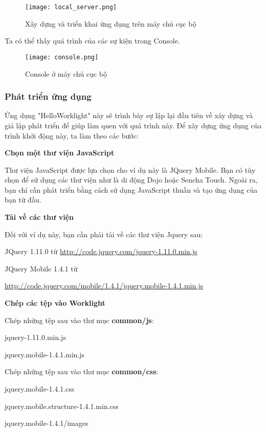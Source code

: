 \begin{figure}[!htb] 
\centering
\texttt{[image: local\_server.png]}
\caption{Xây dựng và triển khai ứng dụng trên máy chủ cục bộ}
\end{figure}
\newpage

Ta có thể thấy quá trình của các sự kiện trong Console.
\begin{figure}[!htb] 
\centering
\texttt{[image: console.png]}
\caption{Console ở máy chủ cục bộ}
\end{figure}

\subsubsection{Phát triển ứng dụng}
Ứng dụng "HelloWorklight" này sẽ trình bày sự lập lại đầu tiên về xây dựng và giả lập phát triển để giúp làm quen với quá trình này. Để xây dựng ứng dụng của trình khởi động này, ta làm theo các bước:

\quad \textbf{Chọn một thư viện JavaScript}

\quad Thư viện JavaScript được lựa chọn cho ví dụ này là JQuery Mobile. Bạn có tùy chọn để sử dụng các thư viện như là di động Dojo hoặc Sencha Touch. Ngoài ra, bạn chỉ cần phát triển bằng cách sử dụng JavaScript thuần và tạo ứng dụng của bạn từ đầu.

\quad \textbf{Tải về các thư viện}

\quad Đối với ví dụ này, bạn cần phải tải về các thư viện Jquery sau:

\quad \quad JQuery 1.11.0 từ \url{http://code.jquery.com/jquery-1.11.0.min.js}
 
\quad \quad JQuery Mobile 1.4.1 từ
 
\quad \quad \url{http://code.jquery.com/mobile/1.4.1/jquery.mobile-1.4.1.min.js}

\quad \textbf{Chép các tệp vào Worklight }

\quad Chép những tệp sau vào thư mục \textbf{common/js}:

\quad \quad jquery-1.11.0.min.js

\quad \quad jquery.mobile-1.4.1.min.js

\quad Chép những tệp sau vào thư mục \textbf{common/css}:

\quad \quad jquery.mobile-1.4.1.css

\quad \quad jquery.mobile.structure-1.4.1.min.css

\quad \quad jquery.mobile-1.4.1/images

